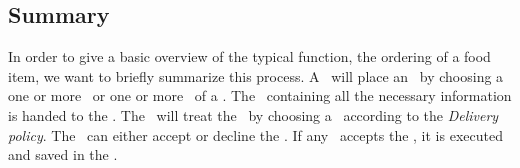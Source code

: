 
\subsection{Summary} %

In order to give a basic overview of the typical function, the ordering of a food item,
we want to briefly summarize this process.
A \Customer~will place an \Order~by choosing a one or more \Meal~or one or more \Dish~of a \Restaurant.
The \Order~containing all the necessary information is handed to the \Core.
The \Core~will treat the \Order~by choosing a \Courier~according to the \emph{Delivery policy}. 
The \Courier~can either accept or decline the \Order. If any \Courier~accepts the \Order,
it is executed and saved in the \Core.


